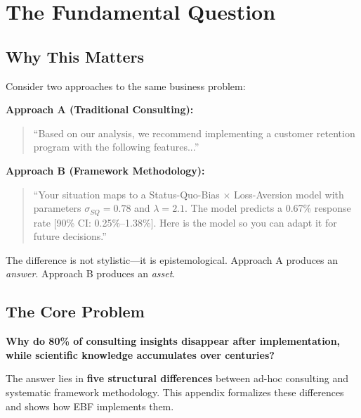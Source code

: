 \section{The Fundamental Question}
\label{sec:fm-fundamental}

\subsection{Why This Matters}

Consider two approaches to the same business problem:

\textbf{Approach A (Traditional Consulting):}
\begin{quote}
``Based on our analysis, we recommend implementing a customer retention program with the following features...''
\end{quote}

\textbf{Approach B (Framework Methodology):}
\begin{quote}
``Your situation maps to a Status-Quo-Bias $\times$ Loss-Aversion model with parameters $\sigma_{SQ} = 0.78$ and $\lambda = 2.1$. The model predicts a 0.67\% response rate [90\% CI: 0.25\%--1.38\%]. Here is the model so you can adapt it for future decisions.''
\end{quote}

The difference is not stylistic---it is epistemological. Approach A produces an \textit{answer}. Approach B produces an \textit{asset}.

\subsection{The Core Problem}

\begin{tcolorbox}[colback=red!5!white, colframe=red!75!black,
    title=The Fundamental Question]
\textbf{Why do 80\% of consulting insights disappear after implementation, while scientific knowledge accumulates over centuries?}
\end{tcolorbox}

The answer lies in \textbf{five structural differences} between ad-hoc consulting and systematic framework methodology. This appendix formalizes these differences and shows how EBF implements them.


